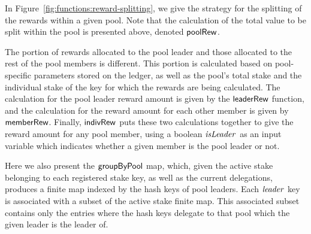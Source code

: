 In Figure~\ref{fig:functions:reward-splitting}, we give the strategy for the
splitting of the rewards within a given pool. Note that the calculation of
the total value to be split within the pool is presented above, denoted $\mathsf{poolRew}$.

The portion of rewards allocated to the pool leader and those allocated to
the rest of the pool members is different. This portion is calculated based
on pool-specific parameters stored on the ledger, as well as
the pool's total stake and the individual stake of the key for which the rewards
are being calculated. The calculation for the pool
leader reward amount is given by the $\mathsf{leaderRew}$ function, and the
calculation for the reward amount for each other member is given by $\mathsf{memberRew}$.
Finally, $\mathsf{indivRew}$ puts these two calculations together to give the
reward amount for any pool member, using a boolean $\mathit{isLeader}$
as an input variable which indicates
whether a given member is the pool leader or not.

Here we also present the $\mathsf{groupByPool}$ map, which, given the active stake
belonging to each registered stake key,
as well as the current delegations, produces a
finite map indexed by the hash keys of pool leaders. Each $\mathit{leader}$ key is associated
with a subset of the active stake finite map. This associated subset
contains only the entries where the hash keys delegate to that pool
which the given leader is the leader of.

